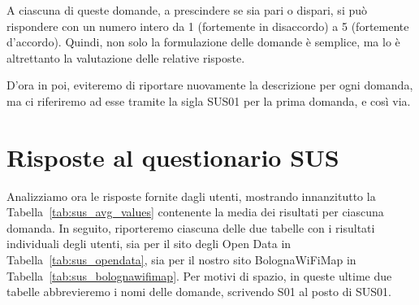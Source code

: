 A ciascuna di queste domande, a prescindere se sia pari o dispari, si può rispondere con un numero intero da 1 (fortemente in disaccordo) a 5 (fortemente d'accordo). Quindi, non solo la formulazione delle domande è semplice, ma lo è altrettanto la valutazione delle relative risposte.

D'ora in poi, eviteremo di riportare nuovamente la descrizione per ogni domanda, ma ci riferiremo ad esse tramite la sigla SUS01 per la prima domanda, e così via.

\section{Risposte al questionario SUS}
Analizziamo ora le risposte fornite dagli utenti, mostrando innanzitutto la Tabella~\ref{tab:sus_avg_values} contenente la media dei risultati per ciascuna domanda. In seguito, riporteremo ciascuna delle due tabelle con i risultati individuali degli utenti, sia per il sito degli Open Data in Tabella~\ref{tab:sus_opendata}, sia per il nostro sito BolognaWiFiMap in Tabella~\ref{tab:sus_bolognawifimap}. Per motivi di spazio, in queste ultime due tabelle abbrevieremo i nomi delle domande, scrivendo S01 al posto di SUS01.

